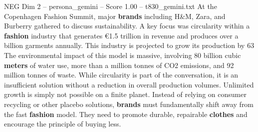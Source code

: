 \begin{textsample}{NEG Dim 2 – persona\_gemini – Score 1.00 – t830\_gemini.txt}  \label{ex:f2_neg_012}
At the Copenhagen Fashion Summit, major \textbf{brands} including H\&M, Zara, and Burberry gathered to discuss sustainability.
A key focus was circularity within a \textbf{fashion} industry that generates €1.5 trillion in revenue and produces over a billion garments annually.
This industry is projected to grow its production by 63 %
The environmental impact of this model is massive, involving 80 billion cubic \textbf{meters} of water use, more than a million tonnes of CO2 emissions, and 92 million tonnes of waste.
While circularity is part of the conversation, it is an insufficient solution without a reduction in overall production volumes.
Unlimited growth is simply not possible on a finite planet.
Instead of relying on consumer recycling or other placebo solutions, \textbf{brands} must fundamentally shift away from the fast \textbf{fashion} model.
They need to promote durable, repairable \textbf{clothes} and encourage the principle of buying less.

\end{textsample}
